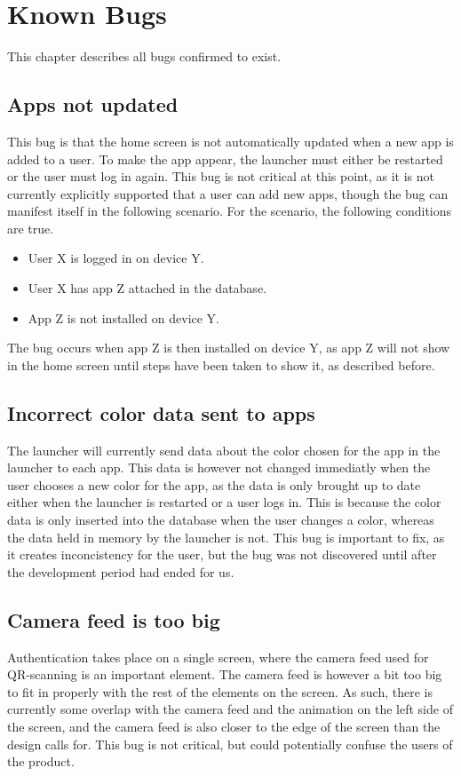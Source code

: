 \chapter{Known Bugs}
\label{test:known_bugs}
This chapter describes all bugs confirmed to exist. 

\section{Apps not updated}
This bug is that the home screen is not automatically updated when a new app is added to a user. 
To make the app appear, the launcher must either be restarted or the user must log in again. 
This bug is not critical at this point, as it is not currently explicitly supported that a user can add new apps, though the bug can manifest itself in the following scenario.\newline
For the scenario, the following conditions are true.

\begin{itemize}
	\item User X is logged in on device Y.
	\item User X has app Z attached in the database. 
	\item App Z is not installed on device Y.
\end{itemize}

The bug occurs when app Z is then installed on device Y, as app Z will not show in the home screen until steps have been taken to show it, as described before. 

\section{Incorrect color data sent to apps}
The launcher will currently send data about the color chosen for the app in the launcher to each app. 
This data is however not changed immediatly when the user chooses a new color for the app, as the data is only brought up to date either when the launcher is restarted or a user logs in. 
This is because the color data is only inserted into the database when the user changes a color, whereas the data held in memory by the launcher is not. 
This bug is important to fix, as it creates inconcistency for the user, but the bug was not discovered until after the development period had ended for us. 

\section{Camera feed is too big}
Authentication takes place on a single screen, where the camera feed used for QR-scanning is an important element. 
The camera feed is however a bit too big to fit in properly with the rest of the elements on the screen. 
As such, there is currently some overlap with the camera feed and the animation on the left side of the screen, and the camera feed is also closer to the edge of the screen than the design calls for.
This bug is not critical, but could potentially confuse the users of the product. 